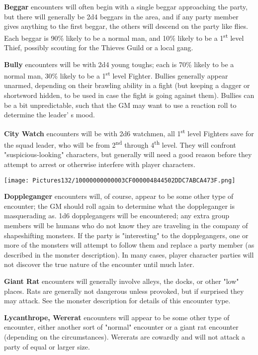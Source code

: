 \documentclass[a4paper,twoside,openany,10pt]{book}
\begin{document}
\begin{multicols}{2}
\textbf{Beggar} encounters will often begin with a single beggar approaching the party, but there will generally be 2d4 beggars in the area, and if any party member gives anything to the first beggar, the others will descend on the party like flies. Each beggar is 90\% likely to be a normal man, and 10\% likely to be a 1\textsuperscript{st} level Thief, possibly scouting for the Thieves Guild or a local gang.


\textbf{Bully} encounters will be with 2d4 young toughs; each is 70\% likely to be a normal man, 30\% likely to be a 1\textsuperscript{st} level Fighter. Bullies generally appear unarmed, depending on their brawling ability in a fight (but keeping a dagger or shortsword hidden, to be used in case the fight is going against them). Bullies can be a bit unpredictable, such that the GM may want to use a reaction roll to determine the leader' s mood.

\textbf{City Watch }encounters will be with 2d6 watchmen, all 1\textsuperscript{st} level Fighters save for the squad leader, who will be from 2\textsuperscript{nd} through 4\textsuperscript{th} level. They will confront "suspicious-looking" characters, but generally will need a good reason before they attempt to arrest or otherwise interfere with player characters.


\begin{flushleft} \texttt{[image: Pictures132/10000000000003CF000004844502DDC7ABCA473F.png]}  \end{flushleft}

\textbf{Doppleganger} encounters will, of course, appear to be some other type of encounter; the GM should roll again to determine what the doppleganger is masquerading as. 1d6 dopplegangers will be encountered; any extra group members will be humans who do not know they are traveling in the company of shapeshifting monsters. If the party is "interesting" to the dopplegangers, one or more of the monsters will attempt to follow them and replace a party member (as described in the monster description). In many cases, player character parties will not discover the true nature of the encounter until much later. 

\textbf{Giant Rat} encounters will generally involve alleys, the docks, or other "low" places. Rats are generally not dangerous unless provoked, but if surprised they may attack. See the monster description for details of this encounter type.

\textbf{Lycanthrope, Wererat} encounters will appear to be some other type of encounter, either another sort of "normal" encounter or a giant rat encounter (depending on the circumstances). Wererats are cowardly and will not attack a party of equal or larger size.


\end{multicols}
\end{document}
